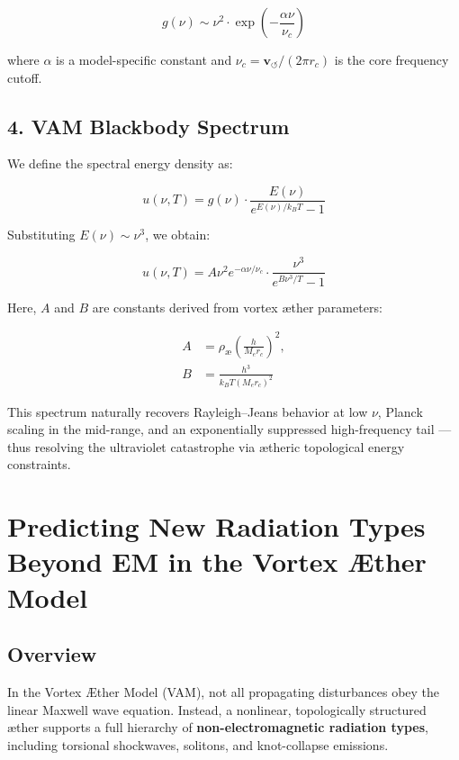 \documentclass[12pt]{article}
\begin{document}
\begin{equation}
g(\nu) \sim \nu^2 \cdot \exp\left(-\frac{\alpha \nu}{\nu_c}\right)
\end{equation}

where \( \alpha \) is a model-specific constant and \( \nu_c = \mathbf{v}_{\scriptscriptstyle\boldsymbol{\circlearrowleft}} / (2\pi r_c) \) is the core frequency cutoff.

\subsection*{4. VAM Blackbody Spectrum}

We define the spectral energy density as:

\begin{equation}
u(\nu, T) = g(\nu) \cdot \frac{E(\nu)}{e^{E(\nu)/k_B T} - 1}
\end{equation}

Substituting \( E(\nu) \sim \nu^3 \), we obtain:

\begin{equation}
\boxed{
u(\nu, T) = A \nu^2 e^{-\alpha \nu/\nu_c} \cdot
\frac{\nu^3}{e^{B \nu^3 / T} - 1}
}
\end{equation}

Here, \( A \) and \( B \) are constants derived from vortex æther parameters:

\begin{align}
A &= \rho_\text{\ae} \left( \frac{h}{M_e r_c} \right)^2, \\
B &= \frac{h^3}{k_B T \left(M_e r_c\right)^2}
\end{align}

This spectrum naturally recovers Rayleigh–Jeans behavior at low \( \nu \), Planck scaling in the mid-range, and an exponentially suppressed high-frequency tail — thus resolving the ultraviolet catastrophe via ætheric topological energy constraints.

\section{Predicting New Radiation Types Beyond EM in the Vortex Æther Model}

\subsection*{Overview}

In the Vortex Æther Model (VAM), not all propagating disturbances obey the linear Maxwell wave equation. Instead, a nonlinear, topologically structured æther supports a full hierarchy of \textbf{non-electromagnetic radiation types}, including torsional shockwaves, solitons, and knot-collapse emissions.
\end{document}
